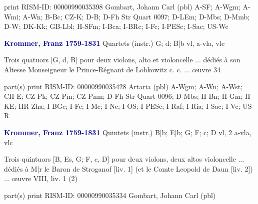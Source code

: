\documentclass[twocolumn]{book}
\begin{document}
\newline print
\newline RISM-ID: 00000990035398
\newline Gombart, Johann Carl  (pbl)
\newline A-SF; A-Wgm; A-Wmi; A-Wn; B-Bc; CZ-K; D-B; D-Fh  Str Quart 0097; D-LEm; D-Mbs; D-Mmb; D-W; DK-Kk; GB-Lbl; H-SFm; I-Bca; I-BRc; I-Fc; I-PESc; I-Sac; US-Wc
\newline \par \vspace{7pt} \textcolor{darkblue}{\textbf{Krommer, Franz  1759-1831}}
\newline Quartets (instr.)  G; d; B|b  
 vl, a-vla, vlc
\newline \begin{itshape}Trois quatuors [G, d, B] pour deux violons, alto et violoncelle ... dédiés à son Altesse Monseigneur le Prince-Régnant de Lobkowitz c. c. ... œuvre 34\end{itshape} 
\newline \textcolor{darkblue}{}  part(s)  
\newline print
\newline RISM-ID: 00000990035428
\newline Artaria  (pbl)
\newline A-Wgm; A-Wn; A-Wst; CH-E; CZ-Pk; CZ-Pm; CZ-Pnm; D-Fh  Str Quart 0096; D-Mbs; H-Bn; H-Gm; H-KE; HR-Zha; I-BGc; I-Fc; I-Mc; I-Nc; I-OS; I-PESc; I-Raf; I-Ria; I-Sac; I-Vc; US-R
\newline \par \vspace{7pt} \textcolor{darkblue}{\textbf{Krommer, Franz  1759-1831}}
\newline Quintets (instr.)  B|b; E|b; G; F; c; D  
 vl, 2 a-vla, vlc
\newline \begin{itshape}Trois quintuors [B, Es, G; F, c, D] pour deux violons, deux altos  violoncelle ... dédiés à M|r le Baron de Stroganof [liv. 1] (et le Comte Leopold de Daun [liv. 2]) ... œuvre VIII, liv. 1 (2)\end{itshape} 
\newline \textcolor{darkblue}{}  part(s)  
\newline print
\newline RISM-ID: 00000990035334
\newline Gombart, Johann Carl  (pbl)
\end{document}
